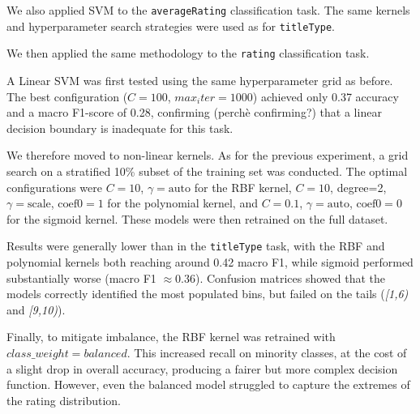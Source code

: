 

We also applied SVM to the \texttt{averageRating} classification task.
The same kernels and hyperparameter search strategies were used as for \texttt{titleType}.

We then applied the same methodology to the \texttt{rating} classification task.

A Linear SVM was first tested using the same hyperparameter grid as before.
The best configuration ($C=100$, $max_iter=1000$) achieved only 0.37 accuracy 
and a macro F1-score of 0.28, confirming (perchè confirming?) that a linear decision 
boundary is inadequate for this task.

We therefore moved to non-linear kernels.
As for the previous experiment, a grid search on a stratified 10\% subset of 
the training set was conducted. The optimal configurations were $C=10$, $\gamma=\text{auto}$ 
for the RBF kernel, $C=10$, degree=2, $\gamma=\text{scale}$, $\text{coef0}=1$ for the polynomial 
kernel, and $C=0.1$, $\gamma=\text{auto}$, $\text{coef0}=0$ for the sigmoid kernel.
These models were then retrained on the full dataset.

Results were generally lower than in the \texttt{titleType} task, with the RBF and polynomial 
kernels both reaching around 0.42 macro F1, while sigmoid performed substantially worse (macro F1 $\approx 0.36$).
Confusion matrices showed that the models correctly identified the most populated bins, but failed on the tails 
(\textit{[1,6)} and \textit{[9,10)}).

Finally, to mitigate imbalance, the RBF kernel was retrained with \texttt{$class\_weight=balanced$}.
This increased recall on minority classes, at the cost of a slight drop in overall accuracy, 
producing a fairer but more complex decision function.
However, even the balanced model struggled to capture the extremes of the rating distribution.


